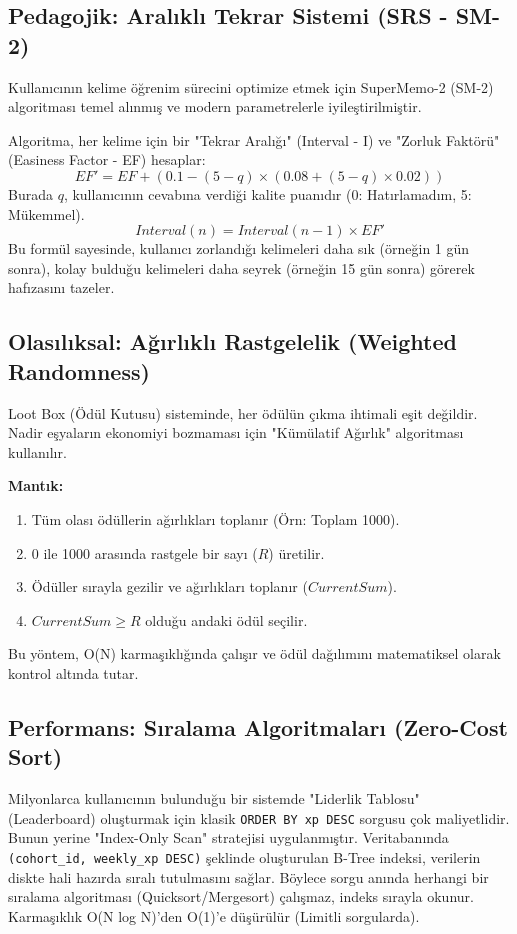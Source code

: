 \documentclass[12pt,a4paper]{report}
\begin{document}
\subsection{Pedagojik: Aralıklı Tekrar Sistemi (SRS - SM-2)}
Kullanıcının kelime öğrenim sürecini optimize etmek için SuperMemo-2 (SM-2) algoritması temel alınmış ve modern parametrelerle iyileştirilmiştir.

Algoritma, her kelime için bir "Tekrar Aralığı" (Interval - I) ve "Zorluk Faktörü" (Easiness Factor - EF) hesaplar:
\begin{equation}
    EF' = EF + (0.1 - (5 - q) \times (0.08 + (5 - q) \times 0.02))
\end{equation}
Burada $q$, kullanıcının cevabına verdiği kalite puanıdır (0: Hatırlamadım, 5: Mükemmel).
\begin{equation}
    Interval(n) = Interval(n-1) \times EF'
\end{equation}
Bu formül sayesinde, kullanıcı zorlandığı kelimeleri daha sık (örneğin 1 gün sonra), kolay bulduğu kelimeleri daha seyrek (örneğin 15 gün sonra) görerek hafızasını tazeler.

\subsection{Olasılıksal: Ağırlıklı Rastgelelik (Weighted Randomness)}
Loot Box (Ödül Kutusu) sisteminde, her ödülün çıkma ihtimali eşit değildir. Nadir eşyaların ekonomiyi bozmaması için "Kümülatif Ağırlık" algoritması kullanılır.

\textbf{Mantık:}
\begin{enumerate}
    \item Tüm olası ödüllerin ağırlıkları toplanır (Örn: Toplam 1000).
    \item 0 ile 1000 arasında rastgele bir sayı ($R$) üretilir.
    \item Ödüller sırayla gezilir ve ağırlıkları toplanır ($CurrentSum$).
    \item $CurrentSum \geq R$ olduğu andaki ödül seçilir.
\end{enumerate}
Bu yöntem, O(N) karmaşıklığında çalışır ve ödül dağılımını matematiksel olarak kontrol altında tutar.

\subsection{Performans: Sıralama Algoritmaları (Zero-Cost Sort)}
Milyonlarca kullanıcının bulunduğu bir sistemde "Liderlik Tablosu" (Leaderboard) oluşturmak için klasik \texttt{ORDER BY xp DESC} sorgusu çok maliyetlidir. Bunun yerine "Index-Only Scan" stratejisi uygulanmıştır.
Veritabanında \texttt{(cohort\_id, weekly\_xp DESC)} şeklinde oluşturulan B-Tree indeksi, verilerin diskte hali hazırda sıralı tutulmasını sağlar. Böylece sorgu anında herhangi bir sıralama algoritması (Quicksort/Mergesort) çalışmaz, indeks sırayla okunur. Karmaşıklık O(N log N)'den O(1)'e düşürülür (Limitli sorgularda).
\end{document}
